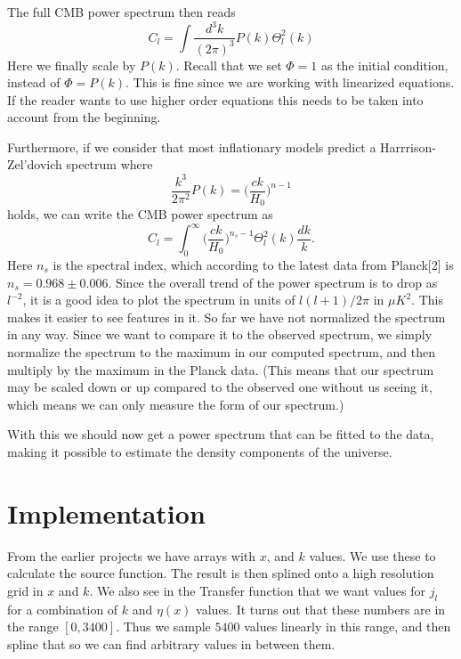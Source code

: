 \documentclass[a4paper]{report}
\begin{document}
The full CMB power spectrum then reads 
\begin{equation}
 C_l = \int\frac{d^3k}{(2\pi)^3}P(k)\Theta_l^2(k)
\end{equation}
Here we finally scale by $P(k)$. Recall that we set $\Phi = 1$ as the initial condition, instead of $\Phi = P(k)$. This is fine since we are working with linearized equations. If the reader wants to use higher order equations this needs to be taken into account from the beginning.

Furthermore, if we consider that most inflationary models predict a Harrrison-Zel'dovich spectrum where 
\begin{equation}
 \frac{k^3}{2\pi^2}P(k) = \bigg(\frac{ck}{H_0}\bigg)^{n-1}
\end{equation}
holds, we can write the CMB power spectrum as
\begin{equation}
  C_l = \int_0^\infty\bigg(\frac{ck}{H_0}\bigg)^{n_s-1}\Theta_l^2(k)\frac{dk}{k}.
\end{equation}
Here $n_s$ is the spectral index, which according to the latest data from Planck[2] is $n_s = 0.968\pm0.006$.
Since the overall trend of the power spectrum is to drop as $l^{-2}$, it is a good idea to plot the spectrum in units of $l(l+1)/2\pi$ in $\mu K^2$. This makes it easier to see features in it. So far we have not normalized the spectrum in any way. Since we want to compare it to the observed spectrum, we simply normalize the spectrum to the maximum in our computed spectrum, and then multiply by the maximum in the Planck data. (This means that our spectrum may be scaled down or up compared to the observed one without us seeing it, which means we can only measure the form of our spectrum.)

With this we should now get a power spectrum that can be fitted to the data, making it possible to estimate the density components of the universe.

\section{Implementation}\label{sec:Imp}
From the earlier projects we have arrays with $x$, and $k$ values. We use these to calculate the source function. The result is then splined onto a high resolution grid in $x$ and $k$. We also see in the Transfer function that we want values for $j_l$ for a combination of $k$ and $\eta(x)$ values. It turns out that these numbers are in the range $[0,3400]$. Thus we sample $5400$ values linearly in this range, and then spline that so we can find arbitrary values in between them. 
\end{document}
